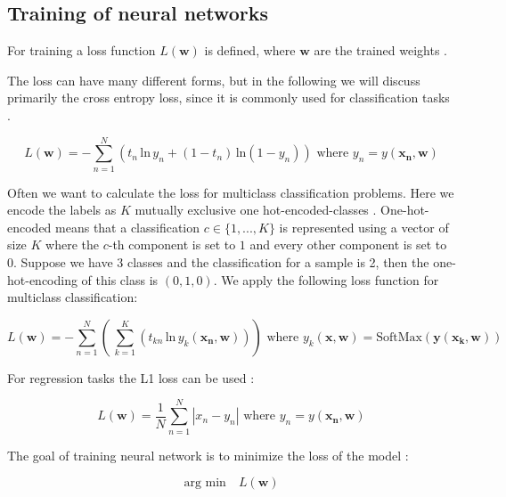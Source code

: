 \documentclass[draft,final,oneside]{vutinfth} %
\begin{document}
\subsection{Training of neural networks} \label{nntrain}

For training a loss function $L(\boldsymbol{w})$ is defined, where $\boldsymbol{w}$ are the trained weights \cite{Goodfellow-et-al-2016}.

The loss can have many different forms, but in the following we will discuss primarily the cross entropy loss, since it is commonly used for classification tasks \cite{dlvc}.

\begin{equation}
L(\boldsymbol{w}) = -\sum_{n=1}^N \left( t_n\,\text{ln}\, y_n + (1 - t_n)\,\text{ln}(1 - y_n)\right) \text{ where } 
y_n = y(\boldsymbol{x_n}, \boldsymbol{w})
\end{equation}

Often we want to calculate the loss for multiclass classification problems. Here we encode the labels as $K$ mutually exclusive one hot-encoded-classes \cite{dlvc}. One-hot-encoded means that a classification $c \in \{1, ..., K\}$ is represented using a vector of size $K$ where the $c$-th component is set to $1$ and every other component is set to $0$. Suppose we have 3 classes and the classification for a sample is 2, then the one-hot-encoding of this class is $(0, 1, 0)$. We apply the following loss function for multiclass classification:

\begin{equation}
L(\boldsymbol{w}) = -\sum_{n=1}^N \left(\,\sum_{k=1}^K \left(t_{kn}\,\text{ln}\,y_k(\boldsymbol{x_n},\boldsymbol{w})\right)\right) \text{ where } y_k(\boldsymbol{x}, \boldsymbol{w}) = \text{SoftMax}(\boldsymbol{y}(\boldsymbol{x_k}, \boldsymbol{w}))
\end{equation}

For regression tasks the L1 loss can be used \cite{accuracy}:

\begin{equation}
L(\boldsymbol{w}) = \dfrac{1}{N} \sum_{n=1}^N |x_n - y_n| \text{ where } 
y_n = y(\boldsymbol{x_n}, \boldsymbol{w})
\end{equation}

The goal of training neural network is to minimize the loss of the model \cite{dlvc}:

\begin{equation}
\text{arg min}\quad L(\boldsymbol{w})
\end{equation}
\end{document}
